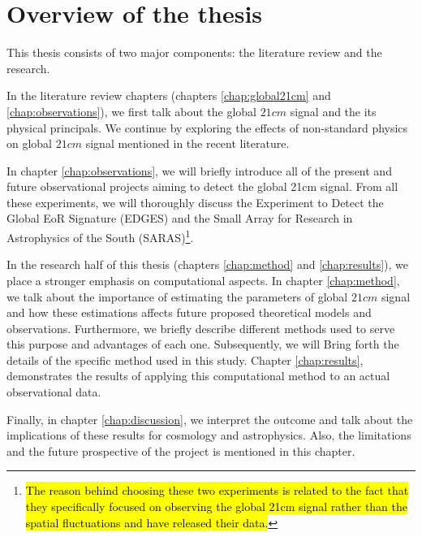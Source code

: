 \documentclass[12pt, TexShade, letterpaper]{report}
\begin{document}
\section{Overview of the thesis}
This thesis consists of two major components: the literature review and the research.\par
In the literature review chapters (chapters \ref{chap:global21cm} and \ref{chap:observations}), we first talk about the global $21cm$ signal and the its physical principals. We continue by exploring the effects of non-standard physics on global $21cm$ signal mentioned in the recent literature. \par
In chapter \ref{chap:observations}, we will briefly introduce all of the present and future observational projects aiming to detect the global 21cm signal. From all these experiments, we will thoroughly discuss the Experiment to Detect the Global EoR Signature (EDGES) and the Small Array for Research in Astrophysics of the South (SARAS)\footnote{\hl{The reason behind choosing these two experiments is related to the fact that they specifically focused on observing the global 21cm signal rather than the spatial fluctuations and have released their data.}}.\par
In the research half of this thesis (chapters \ref{chap:method} and \ref{chap:results}), we place a stronger emphasis on computational aspects. 
In chapter \ref{chap:method}, we talk about the importance of estimating the parameters of global $21cm$ signal and how these estimations affects future proposed theoretical models and observations. Furthermore, we briefly describe different methods used to serve this purpose and advantages of each one.
Subsequently, we will Bring forth the details of the specific method used in this study. 
Chapter \ref{chap:results}, demonstrates the results of applying this computational method to an actual observational data.\par

Finally, in chapter \ref{chap:discussion}, we interpret the outcome and talk about the implications of these results for cosmology and astrophysics. Also, the limitations and the future prospective of the project is mentioned in this chapter.\par
\end{document}
